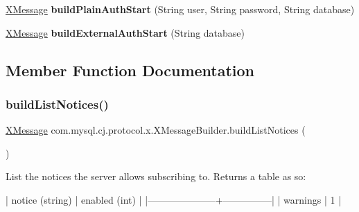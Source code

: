 \begin{DoxyCompactItemize}
\mbox{\hyperlink{classcom_1_1mysql_1_1cj_1_1protocol_1_1x_1_1_x_message}{X\+Message}} {\bfseries build\+Plain\+Auth\+Start} (String user, String password, String database)
\item 
\mbox{\label{classcom_1_1mysql_1_1cj_1_1protocol_1_1x_1_1_x_message_builder_a905274bec5dac7689e4c96b5b6ef5a5c}} 
\mbox{\hyperlink{classcom_1_1mysql_1_1cj_1_1protocol_1_1x_1_1_x_message}{X\+Message}} {\bfseries build\+External\+Auth\+Start} (String database)
\end{DoxyCompactItemize}


\subsection{Member Function Documentation}
\mbox{\label{classcom_1_1mysql_1_1cj_1_1protocol_1_1x_1_1_x_message_builder_aa5a1aea26a2067395d8fc8c37598dfea}} 
\subsubsection{\texorpdfstring{build\+List\+Notices()}{buildListNotices()}}
{\footnotesize\ttfamily \mbox{\hyperlink{classcom_1_1mysql_1_1cj_1_1protocol_1_1x_1_1_x_message}{X\+Message}} com.\+mysql.\+cj.\+protocol.\+x.\+X\+Message\+Builder.\+build\+List\+Notices (\begin{DoxyParamCaption}{ }\end{DoxyParamCaption})}

List the notices the server allows subscribing to. Returns a table as so\+:


\begin{DoxyPre}
| notice (string)     | enabled (int) |
|---------------------+---------------|
| warnings            | 1             |
\end{DoxyPre}
 \mbox{\label{classcom_1_1mysql_1_1cj_1_1protocol_1_1x_1_1_x_message_builder_a961f7a690c9c3f57eddf39e332f6871d}} 
